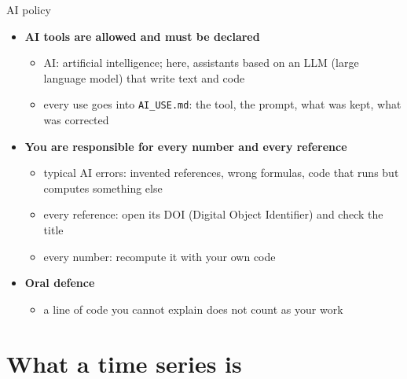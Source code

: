 \begin{frame}{AI policy}
\itemsize{\small}
\begin{itemize}
    \item \hypertarget{ch0-ai-policy}{}\textbf{AI tools are allowed and must be declared}
    \begin{itemize}
        \item AI: artificial intelligence; here, assistants based on an LLM (large language model) that write text and code
        \item every use goes into \texttt{AI\_USE.md}: the tool, the prompt, what was kept, what was corrected
    \end{itemize}
    \item \textbf{You are responsible for every number and every reference}
    \begin{itemize}
        \item typical AI errors: invented references, wrong formulas, code that runs but computes something else
        \item every reference: open its DOI (Digital Object Identifier) and check the title
        \item every number: recompute it with your own code
    \end{itemize}
    \item \textbf{Oral defence}
    \begin{itemize}
        \item a line of code you cannot explain does not count as your work
    \end{itemize}
\end{itemize}
\end{frame}


\section{What a time series is}

